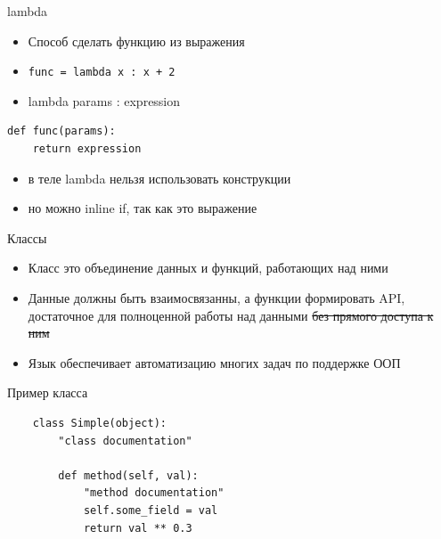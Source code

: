 \documentclass{article}
\begin{document}
\LARGE

\begin{center} lambda \end{center}

\begin{itemize}
    \item Способ сделать функцию из выражения
    \item \lstinline!func = lambda x : x + 2!
    \item lambda params : expression 
\end{itemize}
\begin{lstlisting}
def func(params):
    return expression
\end{lstlisting}
\begin{itemize}
    \item в теле lambda нельзя использовать конструкции
    \item но можно inline if, так как это выражение
\end{itemize}
\newpage 

\begin{center} Классы \end{center}
\begin{itemize}
    \item Класс это объединение данных и функций, работающих над ними
    \item Данные должны быть взаимосвязанны, а функции формировать API, 
            достаточное для полноценной работы над данными \sout{без прямого 
            доступа к ним}
    \item Язык обеспечивает автоматизацию многих задач по поддержке ООП
\end{itemize}
\newpage

\begin{center} Пример класса \end{center}
\vspace{15pt}
\begin{lstlisting}
    class Simple(object):
        "class documentation"

        def method(self, val):
            "method documentation"
            self.some_field = val
            return val ** 0.3
\end{lstlisting}
\newpage
\end{document}
